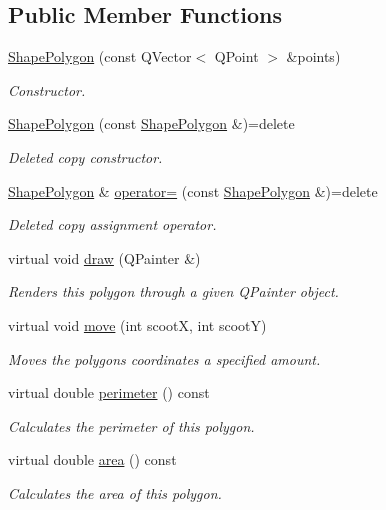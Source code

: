 \subsection*{Public Member Functions}
\begin{DoxyCompactItemize}
\item 
\mbox{\hyperlink{class_shape_polygon_a61a8bdd77cdf95139b6ee728a9000e45}{Shape\+Polygon}} (const Q\+Vector$<$ Q\+Point $>$ \&points)
\begin{DoxyCompactList}\small\item\em Constructor. \end{DoxyCompactList}\item 
\mbox{\hyperlink{class_shape_polygon_a51d433edd43f608acce1fae81e5583d5}{Shape\+Polygon}} (const \mbox{\hyperlink{class_shape_polygon}{Shape\+Polygon}} \&)=delete
\begin{DoxyCompactList}\small\item\em Deleted copy constructor. \end{DoxyCompactList}\item 
\mbox{\hyperlink{class_shape_polygon}{Shape\+Polygon}} \& \mbox{\hyperlink{class_shape_polygon_ae16e02c40d2c3e05aeba75613e38de12}{operator=}} (const \mbox{\hyperlink{class_shape_polygon}{Shape\+Polygon}} \&)=delete
\begin{DoxyCompactList}\small\item\em Deleted copy assignment operator. \end{DoxyCompactList}\item 
virtual void \mbox{\hyperlink{class_shape_polygon_a6f4ed4749a739aaf44b5680d75ae8538}{draw}} (Q\+Painter \&)
\begin{DoxyCompactList}\small\item\em Renders this polygon through a given Q\+Painter object. \end{DoxyCompactList}\item 
virtual void \mbox{\hyperlink{class_shape_polygon_a1f67f660d14090b21c00e2892f764451}{move}} (int scootX, int scootY)
\begin{DoxyCompactList}\small\item\em Moves the polygon\textquotesingle{}s coordinates a specified amount. \end{DoxyCompactList}\item 
virtual double \mbox{\hyperlink{class_shape_polygon_acb81cc3272ad00038abd6f1a7a155b2e}{perimeter}} () const
\begin{DoxyCompactList}\small\item\em Calculates the perimeter of this polygon. \end{DoxyCompactList}\item 
virtual double \mbox{\hyperlink{class_shape_polygon_a60c6cad5af503e0c405523a06e9471eb}{area}} () const
\begin{DoxyCompactList}\small\item\em Calculates the area of this polygon. \end{DoxyCompactList}\end{DoxyCompactItemize}
